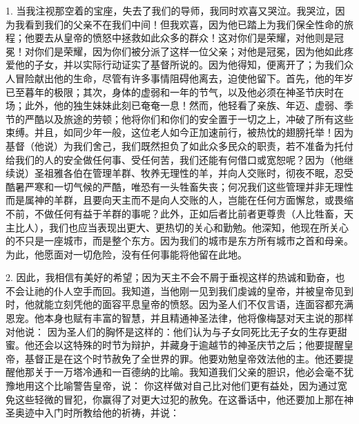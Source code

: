 1. 当我注视那空着的宝座，失去了我们的导师，我同时欢喜又哭泣。我哭泣，因为我看到我们的父亲不在我们中间！但我欢喜，因为他已踏上为我们保全性命的旅程；他要去从皇帝的愤怒中拯救如此众多的群众！这对你们是荣耀，对他则是冠冕！对你们是荣耀，因为你们被分派了这样一位父亲；对他是冠冕，因为他如此疼爱他的子女，并以实际行动证实了基督所说的。因为他得知，便离开了；为我们众人冒险献出他的生命，尽管有许多事情阻碍他离去，迫使他留下。首先，他的年岁已至暮年的极限；其次，身体的虚弱和一年的节气，以及他必须在神圣节庆时在场；此外，他的独生妹妹此刻已奄奄一息！然而，他轻看了亲族、年迈、虚弱、季节的严酷以及旅途的劳顿；他将你们和你们的安全置于一切之上，冲破了所有这些束缚。并且，如同少年一般，这位老人如今正加速前行，被热忱的翅膀托举！因为基督（他说）为我们舍己，我们既然担负了如此众多民众的职责，若不准备为托付给我们的人的安全做任何事、受任何苦，我们还能有何借口或宽恕呢？因为（他继续说）圣祖雅各伯在管理羊群、牧养无理性的羊，并向人交账时，彻夜不眠，忍受酷暑严寒和一切气候的严酷，唯恐有一头牲畜失丧；何况我们这些管理并非无理性而是属神的羊群，且要向天主而不是向人交账的人，岂能在任何方面懈怠，或畏缩不前，不做任何有益于羊群的事呢？此外，正如后者比前者更尊贵（人比牲畜，天主比人），我们也应当表现出更大、更热切的关心和勤勉。他深知，他现在所关心的不只是一座城市，而是整个东方。因为我们的城市是东方所有城市之首和母亲。为此，他愿面对一切危险，没有任何事能将他留在此地。\par

2. 因此，我相信有美好的希望；因为天主不会不屑于垂视这样的热诚和勤奋，也不会让祂的仆人空手而回。我知道，当他刚一见到我们虔诚的皇帝，并被皇帝见到时，他就能立刻凭他的面容平息皇帝的愤怒。因为圣人们不仅言语，连面容都充满恩宠。他本身也赋有丰富的智慧，并且精通神圣法律，他将像梅瑟对天主说的那样对他说： 因为圣人们的胸怀是这样的：他们认为与子女同死比无子女的生存更甜蜜。他还会以这特殊的时节为辩护，并藏身于逾越节的神圣庆节之后；他要提醒皇帝，基督正是在这个时节赦免了全世界的罪。他要劝勉皇帝效法他的主。他还要提醒他那关于一万塔冷通和一百德纳的比喻。我知道我们父亲的胆识，他必会毫不犹豫地用这个比喻警告皇帝，说： 你这样做对自己比对他们更有益处，因为通过宽免这些轻微的冒犯，你赢得了对更大过犯的赦免。在这番话中，他还要加上那在神圣奥迹中入门时所教给他的祈祷，并说：\par

